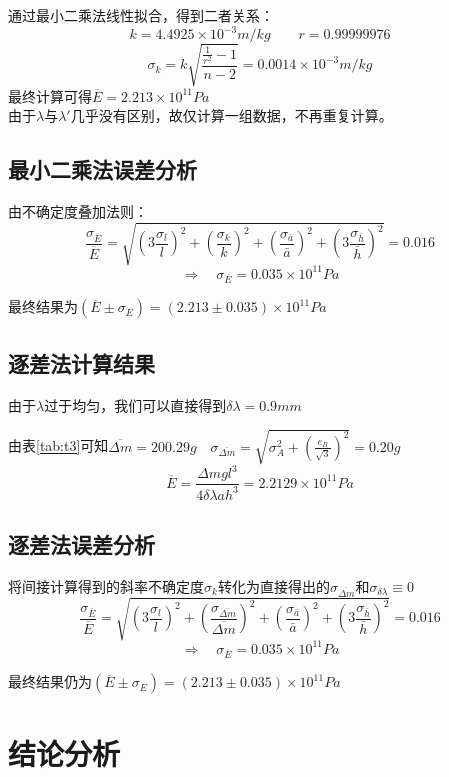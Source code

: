 \documentclass[12pt, a4paper]{ctexart}
\begin{document}
通过最小二乘法线性拟合，得到二者关系：\\
\[
    k = 4.4925\times 10^{-3}m/kg \qquad r = 0.99999976
\]
\[
    \sigma_k = k \sqrt{\frac{\frac1{r^2}-1}{n-2}} = 0.0014\times 10^{-3}m/kg
\]
最终计算可得$\overline{E} = 2.213 \times 10^{11} Pa $\\
由于$\lambda$与$\lambda'$几乎没有区别，故仅计算一组数据，不再重复计算。


\subsection{最小二乘法误差分析}
由不确定度叠加法则：
\[
    \frac{\sigma_{\overline{E}}}{\overline{E}} = \sqrt{(3\frac{\sigma_l}l)^2 + (\frac{\sigma_{k}}{k})^2 + (\frac{\sigma_{\bar{a}}}{\bar{a}})^2 + (3\frac{\sigma_{\bar{h}}}{\bar{h}})^2}
    = 0.016
\]
\[
    \Rightarrow \quad \sigma_{\overline{E}} = 0.035 \times 10^{11}Pa
\]

最终结果为$(\overline{E} \pm \sigma_E) = (2.213 \pm 0.035)\times 10^{11}Pa$

\subsection{逐差法计算结果}
由于$\lambda$过于均匀，我们可以直接得到$\delta \lambda = 0.9mm $

由表\ref{tab:t3}可知$\displaystyle{\overline{\Delta m} = 200.29g \quad \sigma_{\overline{\Delta m}} = \sqrt{\sigma_{A}^2 + (\frac{e_{B}}{\sqrt{3}})^2 } = 0.20g} $
\[
    \overline{E} = \frac{\Delta mgl^3}{4\delta \lambda ah^3} = 2.2129\times 10^{11}Pa
\]

\subsection{逐差法误差分析}
将间接计算得到的斜率不确定度$\sigma_{k}$转化为直接得出的$\sigma_{\overline{\Delta m}}$和$\sigma_{\delta \lambda}\equiv 0$
\[
    \frac{\sigma_{\overline{E}}}{\overline{E}} = \sqrt{(3\frac{\sigma_l}l)^2 + (\frac{\sigma_{\overline{\Delta m}}}{\overline{\Delta m}})^2 + (\frac{\sigma_{\bar{a}}}{\bar{a}})^2 + (3\frac{\sigma_{\bar{h}}}{\bar{h}})^2}
    = 0.016
\]
\[
    \Rightarrow \quad \sigma_{\overline{E}} = 0.035 \times 10^{11}Pa
\]

最终结果仍为$(\overline{E} \pm \sigma_E) = (2.213 \pm 0.035)\times 10^{11}Pa$

\section{结论分析}
\end{document}

